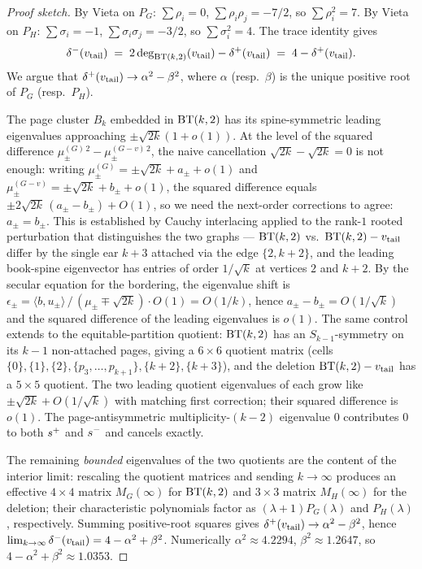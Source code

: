\begin{proof}[Proof sketch]
By Vieta on $P_{G}$: $\sum \rho_{i} = 0$, $\sum \rho_{i} \rho_{j} = -7/2$,
so $\sum \rho_{i}^{2} = 7$. By Vieta on $P_{H}$:
$\sum \sigma_{i} = -1$, $\sum \sigma_{i}\sigma_{j} = -3/2$, so
$\sum \sigma_{i}^{2} = 4$. The trace identity gives
\[
\delta^{-}(v_{\mathrm{tail}})
\;=\; 2 \deg_{\mathrm{BT}(k,2)}(v_{\mathrm{tail}}) - \delta^{+}(v_{\mathrm{tail}})
\;=\; 4 - \delta^{+}(v_{\mathrm{tail}}).
\]
We argue that $\delta^{+}(v_{\mathrm{tail}}) \to \alpha^{2} - \beta^{2}$,
where $\alpha$ (resp.\ $\beta$) is the unique positive root of
$P_{G}$ (resp.\ $P_{H}$).

The page cluster $B_{k}$ embedded in $\mathrm{BT}(k,2)$ has its
spine-symmetric leading eigenvalues approaching $\pm\sqrt{2k}(1+o(1))$.
At the level of the squared difference
$\mu^{(G)\,2}_{\pm} - \mu^{(G-v)\,2}_{\pm}$, the naive cancellation
$\sqrt{2k} - \sqrt{2k} = 0$ is not enough: writing
$\mu^{(G)}_{\pm} = \pm\sqrt{2k} + a_{\pm} + o(1)$ and
$\mu^{(G-v)}_{\pm} = \pm\sqrt{2k} + b_{\pm} + o(1)$, the squared
difference equals $\pm 2\sqrt{2k}\,(a_{\pm} - b_{\pm}) + O(1)$, so we
need the next-order corrections to agree: $a_{\pm} = b_{\pm}$. This is
established by Cauchy interlacing applied to the rank-$1$ rooted
perturbation that distinguishes the two graphs --- $\mathrm{BT}(k,2)$ vs.\
$\mathrm{BT}(k,2) - v_{\mathrm{tail}}$ differ by the single ear $k+3$
attached via the edge $\{2, k+2\}$, and the leading book-spine
eigenvector has entries of order $1/\sqrt{k}$ at vertices $2$ and
$k+2$. By the secular equation for the bordering, the eigenvalue shift
is $\epsilon_{\pm} = \langle b, u_{\pm}\rangle\,/\,(\mu_{\pm} \mp \sqrt{2k}) \cdot O(1)
= O(1/k)$, hence $a_{\pm} - b_{\pm} = O(1/\sqrt{k})$ and the squared
difference of the leading eigenvalues is $o(1)$. The same control
extends to the equitable-partition quotient: $\mathrm{BT}(k,2)$ has an
$S_{k-1}$-symmetry on its $k-1$ non-attached pages, giving a $6\times 6$
quotient matrix (cells $\{0\}, \{1\}, \{2\}, \{p_{3},\ldots,p_{k+1}\},
\{k+2\}, \{k+3\}$), and the deletion $\mathrm{BT}(k,2) - v_{\mathrm{tail}}$
has a $5\times 5$ quotient. The two leading quotient eigenvalues of
each grow like $\pm\sqrt{2k} + O(1/\sqrt{k})$ with matching first
correction; their squared difference is $o(1)$. The page-antisymmetric
multiplicity-$(k-2)$ eigenvalue $0$ contributes $0$ to both $s^{+}$
and $s^{-}$ and cancels exactly.

The remaining \emph{bounded} eigenvalues of the two quotients are the
content of the interior limit: rescaling the quotient matrices and
sending $k\to\infty$ produces an effective $4\times 4$ matrix
$M_{G}(\infty)$ for $\mathrm{BT}(k,2)$ and $3\times 3$ matrix $M_{H}(\infty)$
for the deletion; their characteristic polynomials factor as
$(\lambda + 1) P_{G}(\lambda)$ and $P_{H}(\lambda)$, respectively.
Summing positive-root squares gives $\delta^{+}(v_{\mathrm{tail}})
\to \alpha^{2} - \beta^{2}$, hence
$\lim_{k \to \infty} \delta^{-}(v_{\mathrm{tail}}) = 4 - \alpha^{2} + \beta^{2}$.
Numerically $\alpha^{2} \approx 4.2294$, $\beta^{2} \approx 1.2647$, so
$4 - \alpha^{2} + \beta^{2} \approx 1.0353$.


\end{proof}
